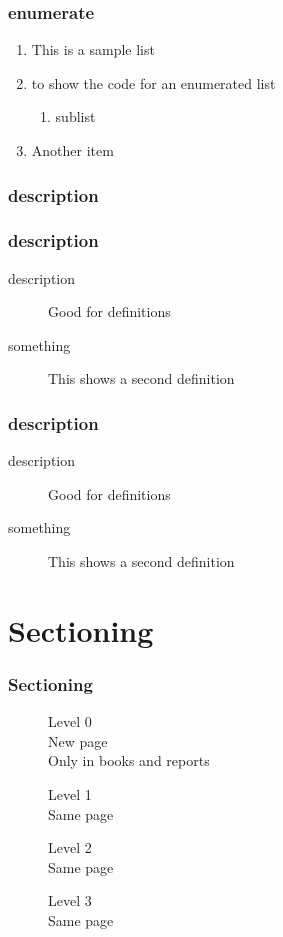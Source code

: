 \begin{frame}
\frametitle{enumerate}
    \begin{enumerate}
        \item This is a sample list
        \item to show the code for an enumerated list
        \begin{enumerate}
            \item sublist
        \end{enumerate}
        \item Another item
   \end{enumerate}
\end{frame}

\subsubsection{description}

\begin{frame}[fragile]
\frametitle{description}
\begin{teX}
\begin{description}
    \item[description] Good for definitions
    \item[something] This shows a second definition
\end{description}
\end{teX}
\end{frame}

\begin{frame}
\frametitle{description}
\begin{description}
    \item[description] Good for definitions
    \item[something] This shows a second definition
\end{description}
\end{frame}


\section{Sectioning}

\begin{frame}
\frametitle{Sectioning}
\begin{description}
    \item[] Level 0\\New page\\Only 
    in books and reports
    \item[] Level 1\\Same page
    \item[] Level 2\\Same page
    \item[] Level 3\\Same page
\end{description}
\end{frame}


